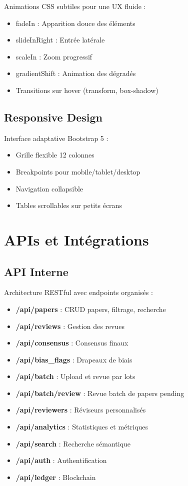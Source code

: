 \documentclass[12pt,a4paper]{article}
\begin{document}
Animations CSS subtiles pour une UX fluide :
\begin{itemize}
    \item fadeIn : Apparition douce des éléments
    \item slideInRight : Entrée latérale
    \item scaleIn : Zoom progressif
    \item gradientShift : Animation des dégradés
    \item Transitions sur hover (transform, box-shadow)
\end{itemize}

\subsection{Responsive Design}

Interface adaptative Bootstrap 5 :
\begin{itemize}
    \item Grille flexible 12 colonnes
    \item Breakpoints pour mobile/tablet/desktop
    \item Navigation collapsible
    \item Tables scrollables sur petits écrans
\end{itemize}

\section{APIs et Intégrations}

\subsection{API Interne}

Architecture RESTful avec endpoints organisés :

\begin{itemize}
    \item \textbf{/api/papers} : CRUD papers, filtrage, recherche
    \item \textbf{/api/reviews} : Gestion des revues
    \item \textbf{/api/consensus} : Consensus finaux
    \item \textbf{/api/bias\_flags} : Drapeaux de biais
    \item \textbf{/api/batch} : Upload et revue par lots
    \item \textbf{/api/batch/review} : Revue batch de papers pending
    \item \textbf{/api/reviewers} : Réviseurs personnalisés
    \item \textbf{/api/analytics} : Statistiques et métriques
    \item \textbf{/api/search} : Recherche sémantique
    \item \textbf{/api/auth} : Authentification
    \item \textbf{/api/ledger} : Blockchain
\end{itemize}
\end{document}
